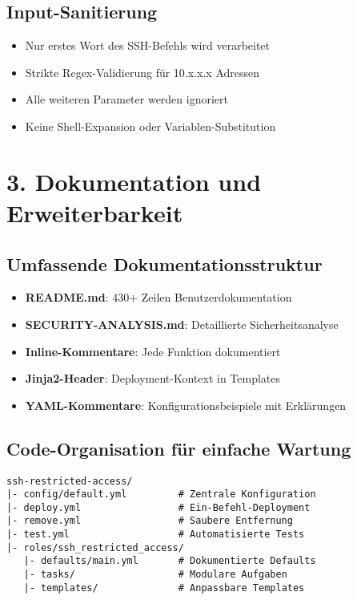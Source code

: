 \documentclass[10pt,a4paper]{article}
\begin{document}
\subsection*{Input-Sanitierung}
\begin{itemize}    \item Nur erstes Wort des SSH-Befehls wird verarbeitet
    \item Strikte Regex-Validierung für 10.x.x.x Adressen
    \item Alle weiteren Parameter werden ignoriert
    \item Keine Shell-Expansion oder Variablen-Substitution
\end{itemize}

\newpage

\section*{3. Dokumentation und Erweiterbarkeit}

\subsection*{Umfassende Dokumentationsstruktur}

\begin{itemize}    \item \textbf{README.md}: 430+ Zeilen Benutzerdokumentation
    \item \textbf{SECURITY-ANALYSIS.md}: Detaillierte Sicherheitsanalyse
    \item \textbf{Inline-Kommentare}: Jede Funktion dokumentiert
    \item \textbf{Jinja2-Header}: Deployment-Kontext in Templates
    \item \textbf{YAML-Kommentare}: Konfigurationsbeispiele mit Erklärungen
\end{itemize}

\subsection*{Code-Organisation für einfache Wartung}

\begin{lstlisting}[title=Verzeichnisstruktur]
ssh-restricted-access/
|- config/default.yml         # Zentrale Konfiguration
|- deploy.yml                 # Ein-Befehl-Deployment
|- remove.yml                 # Saubere Entfernung
|- test.yml                   # Automatisierte Tests
|- roles/ssh_restricted_access/
   |- defaults/main.yml       # Dokumentierte Defaults
   |- tasks/                  # Modulare Aufgaben
   |- templates/              # Anpassbare Templates
\end{lstlisting}
\end{document}

